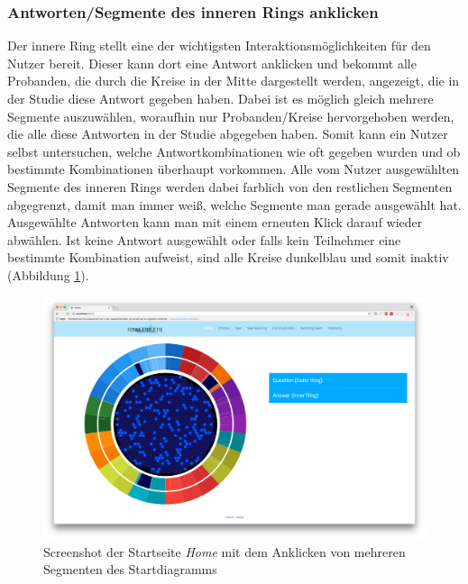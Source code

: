 \documentclass{mi-seminar}
\begin{document}
\subsubsection{Antworten/Segmente des inneren Rings anklicken}
Der innere Ring stellt eine der wichtigsten Interaktionsmöglichkeiten für den Nutzer bereit. Dieser kann dort eine Antwort anklicken und bekommt alle Probanden, die durch die Kreise in der Mitte dargestellt werden, angezeigt, die in der Studie diese Antwort gegeben haben. Dabei ist es möglich gleich mehrere Segmente auszuwählen, woraufhin nur  Probanden/Kreise hervorgehoben werden, die alle diese Antworten in der Studie abgegeben haben. Somit kann ein Nutzer selbst untersuchen, welche Antwortkombinationen wie oft gegeben wurden und ob bestimmte Kombinationen überhaupt vorkommen. Alle vom Nutzer ausgewählten Segmente des inneren Rings werden dabei farblich von den restlichen Segmenten abgegrenzt, damit man immer weiß, welche Segmente man gerade ausgewählt hat. Ausgewählte Antworten kann man mit einem erneuten Klick darauf wieder abwählen. Ist keine Antwort ausgewählt oder falls kein Teilnehmer eine bestimmte Kombination aufweist, sind alle Kreise dunkelblau und somit inaktiv (Abbildung \ref{ScStartDiagramInnerRingClick}).
\begin{figure}[h]
\includegraphics[scale=0.3]{assets/start_click_inner_ring_segments.png}
\caption{Screenshot der Startseite \textit{Home} mit dem Anklicken von mehreren Segmenten des Startdiagramms}
\label{ScStartDiagramInnerRingClick}
\end{figure}
\end{document}
